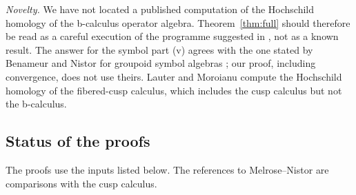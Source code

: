 \documentclass[11pt,oneside,reqno]{article}
\theoremstyle{plain}
\theoremstyle{definition}
\theoremstyle{remark}
\begin{document}
\emph{Novelty.} We have not located a published computation of the
Hochschild homology of the b-calculus operator algebra.
Theorem~\ref{thm:full} should therefore be read as a careful execution of
the programme suggested in \cite{MN}, not as a known result. The answer
for the symbol part (v) agrees with the one stated by Benameur and Nistor
for groupoid symbol algebras \cite{BNsymbols,BNfamilies}; our proof,
including convergence, does not use theirs. Lauter and Moroianu
\cite{LauterMoroianu} compute the Hochschild homology of the fibered-cusp
calculus, which includes the cusp calculus but not the b-calculus.

\subsection{Status of the proofs}\label{subsec:status}
The proofs use the inputs listed below. The references to
Melrose--Nistor \cite{MN} are comparisons with the cusp calculus.
\end{document}
